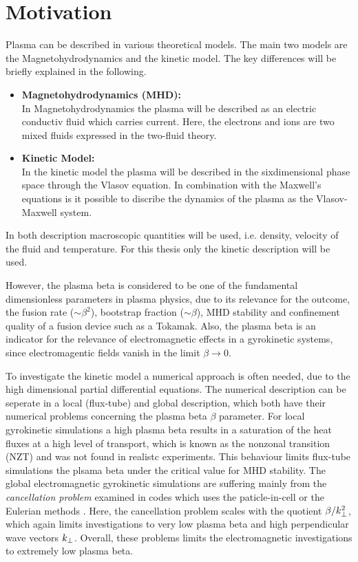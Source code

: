 
\NewPage
\chapter{Motivation}
\label{chap:motivation}

\thispagestyle{empty}
\newpage

Plasma can be described in various theoretical models. The main two models are the Magnetohydrodynamics and the kinetic model. The key differences will be briefly explained in the following.
\begin{itemize}
    \item \textbf{Magnetohydrodynamics (MHD):}\\
        In Magnetohydrodynamics the plasma will be described as an electric conductiv fluid which carries current. Here, the electrons and ions are two mixed fluids expressed in the two-fluid theory. 
    \item \textbf{Kinetic Model:}\\
        In the kinetic model the plasma will be described in the sixdimensional phase space through the Vlasov equation. In combination with the Maxwell's equations is it possible to discribe the dynamics of the plasma as the Vlasov-Maxwell system. 
\end{itemize}
In both description macroscopic quantities will be used, i.e. density, velocity of the fluid and temperature. For this thesis only the kinetic description will be used.

However, the plasma beta is considered to be one of the fundamental dimensionless parameters in plasma physics, due to its relevance for the outcome, the fusion rate ($\sim \beta^2$), bootstrap fraction ($\sim \beta$), MHD stability and confinement quality of a fusion device such as a Tokamak. Also, the plasma beta is an indicator for the relevance of electromagnetic effects in a gyrokinetic systems, since electromagentic fields vanish in the limit $\beta \rightarrow 0$. \bigskip

To investigate the kinetic model a numerical approach is often needed, due to the high dimensional partial differential equations. The numerical description can be seperate in a local (flux-tube) and global description, which both have their numerical problems concerning the plasma beta $\beta$ parameter. For local gyrokinetic simulations a high plasma beta results in a saturation of the heat fluxes at a high level of transport, which is known as the nonzonal transition (NZT) and was not found in realistc experiments. This behaviour limits flux-tube simulations the plsama beta under the critical value for MHD stability. The global electromagnetic gyrokinetic simulations are suffering mainly from the \textit{cancellation problem} \cite{Chen2001} examined in codes which uses the paticle-in-cell or the Eulerian methods \cite{Cummings_PHD}. Here, the cancellation problem scales with the quotient $\beta/k_\perp^2$\cite{Mishchenko2017}, which again limits investigations to very low plasma beta and high perpendicular wave vectors $k_\perp$. Overall, these problems limits the electromagnetic investigations to extremely low plasma beta. \cite{Crandall_PHD}
\bigskip

